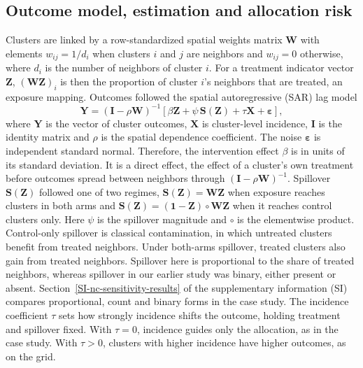 \documentclass[Afour,sagev,times]{sagej}
\begin{document}
\subsection{Outcome model, estimation and allocation risk}
Clusters are linked by a row-standardized spatial weights matrix $\mathbf{W}$ with elements $w_{ij}=1/d_i$ when clusters $i$ and $j$ are neighbors and $w_{ij}=0$ otherwise, where $d_i$ is the number of neighbors of cluster $i$. For a treatment indicator vector $\mathbf{Z}$, $(\mathbf{W}\mathbf{Z})_i$ is then the proportion of cluster $i$'s neighbors that are treated, an exposure mapping.\cite{aronow_estimating_2017,forastiere_identification_2021} Outcomes followed the spatial autoregressive (SAR) lag model\cite{ord_estimation_1975}
\begin{equation}
\mathbf{Y}=(\mathbf{I}-\rho \mathbf{W})^{-1}[\beta \mathbf{Z}+\psi\,\mathbf{S}(\mathbf{Z})+\tau \mathbf{X}+\boldsymbol{\varepsilon}],
\label{eq:grid}
\end{equation}
where $\mathbf{Y}$ is the vector of cluster outcomes, $\mathbf{X}$ is cluster-level incidence, $\mathbf{I}$ is the identity matrix and $\rho$ is the spatial dependence coefficient. The noise $\boldsymbol{\varepsilon}$ is independent standard normal. Therefore, the intervention effect $\beta$ is in units of its standard deviation. It is a direct effect, the effect of a cluster's own treatment before outcomes spread between neighbors through $(\mathbf{I}-\rho \mathbf{W})^{-1}$. Spillover $\mathbf{S}(\mathbf{Z})$ followed one of two regimes, $\mathbf{S}(\mathbf{Z})=\mathbf{W}\mathbf{Z}$ when exposure reaches clusters in both arms and $\mathbf{S}(\mathbf{Z})=(\mathbf{1}-\mathbf{Z})\circ \mathbf{W}\mathbf{Z}$ when it reaches control clusters only. Here $\psi$ is the spillover magnitude and $\circ$ is the elementwise product. Control-only spillover is classical contamination, in which untreated clusters benefit from treated neighbors. Under both-arms spillover, treated clusters also gain from treated neighbors. Spillover here is proportional to the share of treated neighbors, whereas spillover in our earlier study was binary, either present or absent.\cite{walther_spatialcrt_2026} Section~\ref{SI-nc-sensitivity-results} of the supplementary information (SI) compares proportional, count and binary forms in the case study. The incidence coefficient $\tau$ sets how strongly incidence shifts the outcome, holding treatment and spillover fixed. With $\tau=0$, incidence guides only the allocation, as in the case study. With $\tau>0$, clusters with higher incidence have higher outcomes, as on the grid.
\end{document}
